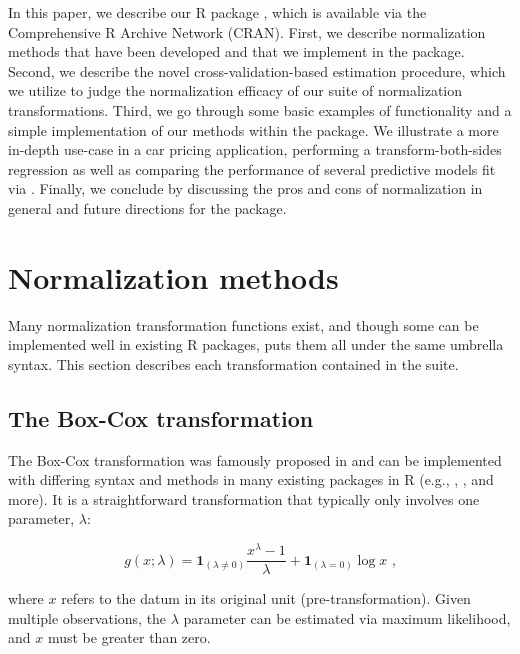 In this paper, we describe our R package , which is
available via the Comprehensive R Archive Network (CRAN). First, we
describe normalization methods that have been developed and that we
implement in the package. Second, we describe the novel
cross-validation-based estimation procedure, which we utilize to judge
the normalization efficacy of our suite of normalization
transformations. Third, we go through some basic examples of
 functionality and a simple implementation of our
methods within the  package. We illustrate a more in-depth
use-case in a car pricing application, performing a transform-both-sides
regression as well as comparing the performance of several predictive
models fit via . Finally, we conclude by discussing the pros
and cons of normalization in general and future directions for the
package.

\hypertarget{normalization-methods}{%
\section{Normalization methods}\label{normalization-methods}}

Many normalization transformation functions exist, and though some can
be implemented well in existing R packages,  puts
them all under the same umbrella syntax. This section describes each
transformation contained in the  suite.

\hypertarget{the-box-cox-transformation}{%
\subsection{The Box-Cox
transformation}\label{the-box-cox-transformation}}

The Box-Cox transformation was famously proposed in \citet{BoxCox1964}
and can be implemented with differing syntax and methods in many
existing packages in R (e.g., ,  \citep{MASS},
and more). It is a straightforward transformation that typically only
involves one parameter, \(\lambda\):

\[
g(x; \lambda) = \boldsymbol 1 _{(\lambda \neq 0)} \frac{x^\lambda-1}{\lambda} 
+ \boldsymbol 1_{(\lambda = 0)} \log x\text{ ,}
\]

\noindent where \(x\) refers to the datum in its original unit
(pre-transformation). Given multiple observations, the \(\lambda\)
parameter can be estimated via maximum likelihood, and \(x\) must be
greater than zero.


